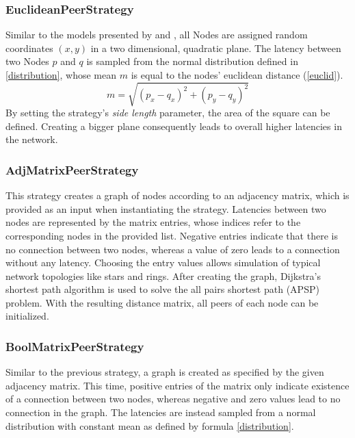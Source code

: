 \documentclass[a4paper,12pt,twoside]{report}
\begin{document}
\subsubsection{EuclideanPeerStrategy}
Similar to the models presented by \cite{mwalemodel} and \cite{selfishmine2}, all Nodes are assigned random coordinates $(x,y)$ in a two dimensional, quadratic plane. The latency between two Nodes $p$ and $q$ is sampled from the normal distribution defined in \autoref{distribution}, whose mean $m$ is equal to the nodes' euclidean distance (\autoref{euclid}).
\begin{equation}\label{euclid}
m = \sqrt{(p_{x}-q_{x})^{2}+(p_{y}-q_{y})^{2}}
\end{equation}
By setting the strategy's \textit{side length} parameter, the area of the square can be defined. Creating a bigger plane consequently leads to overall higher latencies in the network.
\subsubsection{AdjMatrixPeerStrategy}
This strategy creates a graph of nodes according to an adjacency matrix, which is provided as an input when instantiating the strategy. Latencies between two nodes are represented by the matrix entries, whose indices refer to the corresponding nodes in the provided list. Negative entries indicate that there is no connection between two nodes, whereas a value of zero leads to a connection without any latency. Choosing the entry values allows simulation of typical network topologies like stars and rings. After creating the graph, Dijkstra's shortest path algorithm \cite{dijkstra} is used to solve the all pairs shortest path (APSP) problem. With the resulting distance matrix, all peers of each node can be initialized.
\subsubsection{BoolMatrixPeerStrategy}
Similar to the previous strategy, a graph is created as specified by the given adjacency matrix. This time, positive entries of the matrix only indicate existence of a connection between two nodes, whereas negative and zero values lead to no connection in the graph. The latencies are instead sampled from a normal distribution with constant mean as defined by formula \ref{distribution}.
\end{document}
